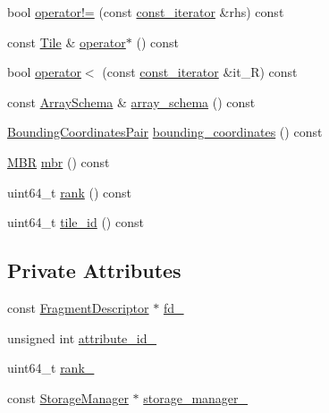 \begin{DoxyCompactItemize}
\item 
bool \hyperlink{classStorageManager_1_1const__iterator_aad252c7ea7328ade08583abe6b5a998e}{operator!=} (const \hyperlink{classStorageManager_1_1const__iterator}{const\+\_\+iterator} \&rhs) const 
\item 
const \hyperlink{classTile}{Tile} \& \hyperlink{classStorageManager_1_1const__iterator_a1c0ae0e61f72e371c2d5415aaa140a74}{operator$\ast$} () const 
\item 
bool \hyperlink{classStorageManager_1_1const__iterator_ac9b3540212b63097b417bc6ef91f068b}{operator$<$} (const \hyperlink{classStorageManager_1_1const__iterator}{const\+\_\+iterator} \&it\+\_\+\+R) const 
\item 
const \hyperlink{classArraySchema}{Array\+Schema} \& \hyperlink{classStorageManager_1_1const__iterator_a7571c503d62e24c237ccaa22beb1bf17}{array\+\_\+schema} () const 
\item 
\hyperlink{classStorageManager_ac8560870eda78bbbf5a864b05767d186}{Bounding\+Coordinates\+Pair} \hyperlink{classStorageManager_1_1const__iterator_a1bd5b8d2073d97afe1fb6c7d10a8cdd8}{bounding\+\_\+coordinates} () const 
\item 
\hyperlink{classStorageManager_aae5e268ee02c08fc12dd74661b43da75}{M\+B\+R} \hyperlink{classStorageManager_1_1const__iterator_a67c17840435914a727790d18bbb0b422}{mbr} () const 
\item 
uint64\+\_\+t \hyperlink{classStorageManager_1_1const__iterator_a1426e7f28ad3e199db265a7e8a69ca52}{rank} () const 
\item 
uint64\+\_\+t \hyperlink{classStorageManager_1_1const__iterator_a46d0c65587031da2eaa651172fd9b300}{tile\+\_\+id} () const 
\end{DoxyCompactItemize}
\subsection*{Private Attributes}
\begin{DoxyCompactItemize}
\item 
const \hyperlink{classStorageManager_1_1FragmentDescriptor}{Fragment\+Descriptor} $\ast$ \hyperlink{classStorageManager_1_1const__iterator_a7cd4fa1cc183096987ed012d8394a5b8}{fd\+\_\+}
\item 
unsigned int \hyperlink{classStorageManager_1_1const__iterator_aac85ccdc98c78876f18455e05169dc24}{attribute\+\_\+id\+\_\+}
\item 
uint64\+\_\+t \hyperlink{classStorageManager_1_1const__iterator_a131add58e77a03a08c9bf8a68efc3faf}{rank\+\_\+}
\item 
const \hyperlink{classStorageManager}{Storage\+Manager} $\ast$ \hyperlink{classStorageManager_1_1const__iterator_aad4ac43b33674fe0c9cabfa149cc0430}{storage\+\_\+manager\+\_\+}
\end{DoxyCompactItemize}


